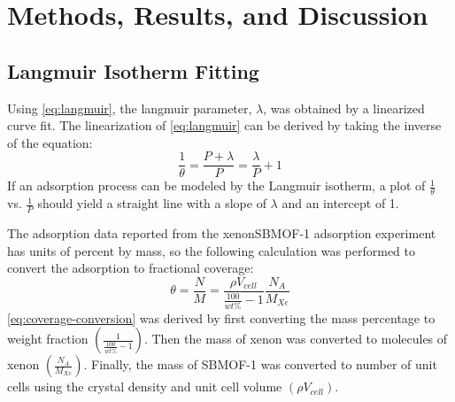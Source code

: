 \documentclass{article}
\begin{document}
\section{Methods, Results, and Discussion}
\subsection{Langmuir Isotherm Fitting}
Using \autoref{eq:langmuir}, the langmuir parameter, $\lambda$, was obtained by a linearized curve fit. The linearization of \autoref{eq:langmuir} can be derived by taking the inverse of the equation:
\begin{equation}
    \frac{1}{\theta} = \frac{P+\lambda}{P} = \frac{\lambda}{P} + 1
    \label{eq:linear-langmuir}
\end{equation}
If an adsorption process can be modeled by the Langmuir isotherm, a plot of $\frac{1}{\theta}$ vs. $\frac{1}{P}$ should yield a straight line with a slope of $\lambda$ and an intercept of 1.

The adsorption data reported from the xenon\textendash SBMOF-1 adsorption experiment has units of percent by mass, so the following calculation was performed to convert the adsorption to fractional coverage:
\begin{equation}
    \theta = \frac{N}{M} = \frac{\rho V_\textit{cell}}{\frac{100}{wt\%} - 1}\frac{N_A}{M_\textit{Xe}}
    \label{eq:coverage-conversion}
\end{equation}
\autoref{eq:coverage-conversion} was derived by first converting the mass percentage to weight fraction $\left(\frac{1}{\frac{100}{wt\%} - 1}\right)$. Then the mass of xenon was converted to molecules of xenon $\left(\frac{N_A}{M_\textit{Xe}}\right)$. Finally, the mass of SBMOF-1 was converted to number of unit cells using the crystal density and unit cell volume $\left(\rho V_\textit{cell}\right)$.
\end{document}
